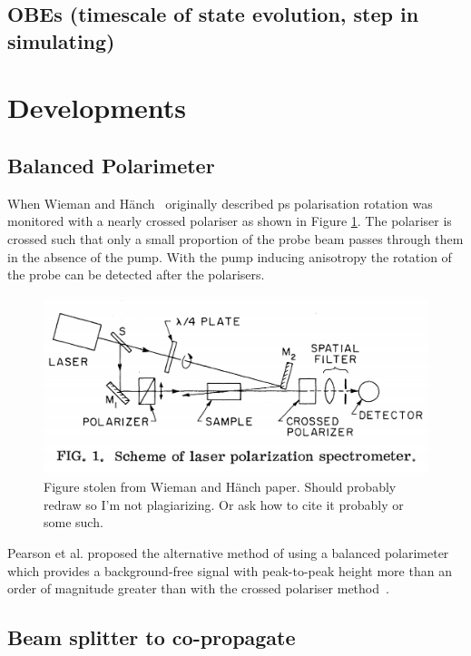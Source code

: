 \subsection{OBEs (timescale of state evolution, step in simulating)}
\section{Developments}
\subsection{Balanced Polarimeter}
When Wieman and H\"anch~\cite{wieman_doppler-free_1976} originally described \gls{ps} polarisation rotation was monitored with a nearly crossed polariser as shown in Figure \ref{figure:wieman_doppler-free_schematic}.
The polariser is crossed such that only a small proportion of the probe beam passes through them in the absence of the pump.
With the pump inducing anisotropy the rotation of the probe can be detected after the polarisers.

\begin{figure}
\includegraphics[width=\linewidth]{chapter1/Figs/wieman_doppler-free_schematic.png}
\caption{Figure stolen from Wieman and H\"anch paper.
Should probably redraw so I'm not plagiarizing.
Or ask how to cite it probably or some such.}
\label{figure:wieman_doppler-free_schematic}
\end{figure}

Pearson et al. proposed the alternative method of using a balanced polarimeter which provides a background-free signal with peak-to-peak height more than an order of magnitude greater than with the crossed polariser method~\cite{pearman_polarization_2002}.

\subsection{Beam splitter to co-propagate}

